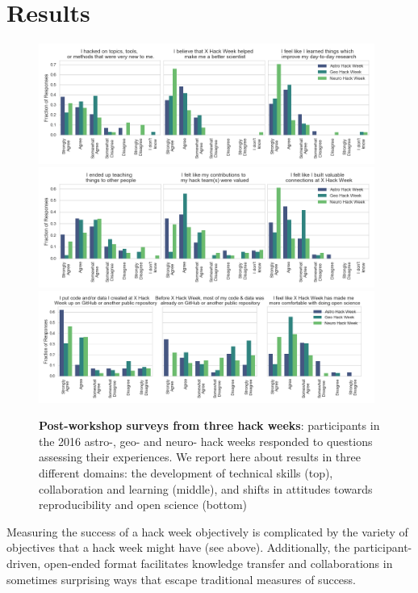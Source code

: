 \section*{Results}

\begin{figure}[h!]
\begin{center}
\includegraphics[width=11cm]{fig/eval_techskills}
\includegraphics[width=11cm]{fig/eval_collab}
\includegraphics[width=11cm]{fig/eval_openscience}
\caption{{\bf Post-workshop surveys from three hack weeks}: participants in the 2016 astro-, geo- and neuro- hack weeks responded to questions assessing their experiences. We report here about results in three different domains: the development of technical skills (top), collaboration and learning (middle), and shifts in attitudes towards reproducibility and open science (bottom)}
\label{fig:survey}
\end{center}
\end{figure}

Measuring the success of a hack week objectively is complicated by the variety of objectives that a hack week might have (see above). 
Additionally, the participant-driven, open-ended format facilitates knowledge transfer and collaborations in sometimes surprising ways that escape traditional measures of success.

